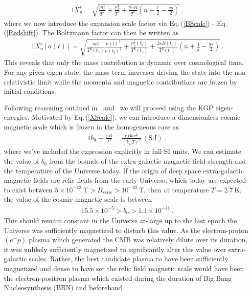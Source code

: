 \documentclass[universe,article,submit,moreauthors,pdftex,a4paper]{Definitions/mdpi}
\newcommand{\req}[1]{Eq.\,(\ref{#1})}
\begin{document}
\begin{alignat}{1}
 \label{XExplicit} X_{n}^{s} = \sqrt{\frac{m_{e}^{2}}{T^{2}}+\frac{p_{z}^{2}}{T^{2}}+\frac{2eB}{T^{2}}\left(n+\frac{1}{2}-\frac{gs}{2}\right)}\,,
\end{alignat}
where we now introduce the expansion scale factor via \req{BScale} - \req{Redshift}. The Boltzmann factor can then be written as
\begin{alignat}{1}
 \label{XScale} X_{n}^{s}[a(t)] = \sqrt{\frac{m_{e}^{2}}{T^{2}(t_{0})}\frac{a(t)^{2}}{a(t_{0})^{2}}+\frac{p_{z}^{2}(t_{0})}{T^{2}(t_{0})}+\frac{2eB(t_{0})}{T^{2}(t_{0})}\left(n+\frac{1}{2}-\frac{gs}{2}\right)}\,.
\end{alignat}
This reveals that only the mass contribution is dynamic over cosmological time. For any given eigen-state, the mass term increases driving the state into the non-relativistic limit while the momenta and magnetic contributions are frozen by initial conditions.

Following reasoning outlined in~\cite{rafelski2023study} and~\cite{Steinmetz:2018ryf} we will proceed using the KGP eigen-energies. Motivated by \req{XScale}, we can introduce a dimensionless cosmic magnetic scale which is frozen in the homogeneous case as
\begin{alignat}{1}
 \label{Bo} b_{0}\equiv\frac{eB}{T^{2}}=\frac{eB\hbar c^{2}}{(k_{B}T)^{2}}\ \mathrm{(S.I)}\,,
\end{alignat}
where we've included the expression explicitly in full SI units. We can estimate the value of $b_{0}$ from the bounds of the extra-galactic magnetic field strength and the temperature of the Universe today. If the origin of deep space extra-galactic magnetic fields are relic fields from the early Universe, which today are expected to exist between $5\times10^{-12}\ \mathrm{T}>B_{relic}>10^{-20}\ \mathrm{T}$, then at temperature $T=2.7\ \mathrm{K}$, the value of the cosmic magnetic scale is between
\begin{alignat}{1}
 \label{BoScale} 5.5\times10^{-5}>b_{0}>1.1\times10^{-11}\,.
\end{alignat}
This should remain constant in the Universe at-large up to the last epoch the Universe was sufficiently magnetized to disturb this value. As the electron-proton $(e^{-}p)$ plasma which generated the CMB was relatively dilute over its duration, it was unlikely sufficiently magnetized to significantly alter this value over extra-galactic scales. Rather, the best candidate plasma to have been sufficiently magnetized and dense to have set the relic field magnetic scale would have been the electron-positron plasma which existed during the duration of Big Bang Nucleosynthesis (BBN) and beforehand.
\end{document}
